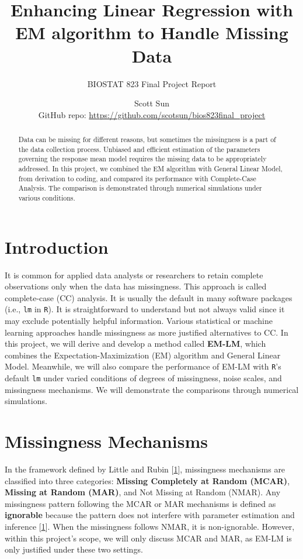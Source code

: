 \documentclass[
  twocolumn]{article}
\title{\textbf{Enhancing Linear Regression with EM algorithm to Handle
Missing Data}}
\subtitle{BIOSTAT 823 Final Project Report}
\author{Scott Sun\\
GitHub repo: \url{https://github.com/scotsun/bios823final_project}}
\date{}
\begin{document}
\maketitle
\begin{abstract}
Data can be missing for different reasons, but sometimes the missingness
is a part of the data collection process. Unbiased and efficient
estimation of the parameters governing the response mean model requires
the missing data to be appropriately addressed. In this project, we
combined the EM algorithm with General Linear Model, from derivation to
coding, and compared its performance with Complete-Case Analysis. The
comparison is demonstrated through numerical simulations under various
conditions.
\end{abstract}

\hypertarget{introduction}{%
\section{Introduction}\label{introduction}}

It is common for applied data analysts or researchers to retain complete
observations only when the data has missingness. This approach is called
complete-case (CC) analysis. It is usually the default in many software
packages (i.e., \texttt{lm} in \texttt{R}). It is straightforward to
understand but not always valid since it may exclude potentially helpful
information. Various statistical or machine learning approaches handle
missingness as more justified alternatives to CC. In this project, we
will derive and develop a method called \textbf{EM-LM}, which combines
the Expectation-Maximization (EM) algorithm and General Linear Model.
Meanwhile, we will also compare the performance of EM-LM with
\texttt{R}'s default \texttt{lm} under varied conditions of degrees of
missingness, noise scales, and missingness mechanisms. We will
demonstrate the comparisons through numerical simulations.

\hypertarget{missingness-mechanisms}{%
\section{Missingness Mechanisms}\label{missingness-mechanisms}}

In the framework defined by Little and Rubin
{[}\protect\hyperlink{ref-little2019statistical}{1}{]}, missingness
mechanisms are classified into three categories: \textbf{Missing
Completely at Random (MCAR)}, \textbf{Missing at Random (MAR)}, and Not
Missing at Random (NMAR). Any missingness pattern following the MCAR or
MAR mechanisms is defined as \textbf{ignorable} because the pattern does
not interfere with parameter estimation and inference
{[}\protect\hyperlink{ref-little2019statistical}{1}{]}. When the
missingness follows NMAR, it is non-ignorable. However, within this
project's scope, we will only discuss MCAR and MAR, as EM-LM is only
justified under these two settings.
\end{document}
